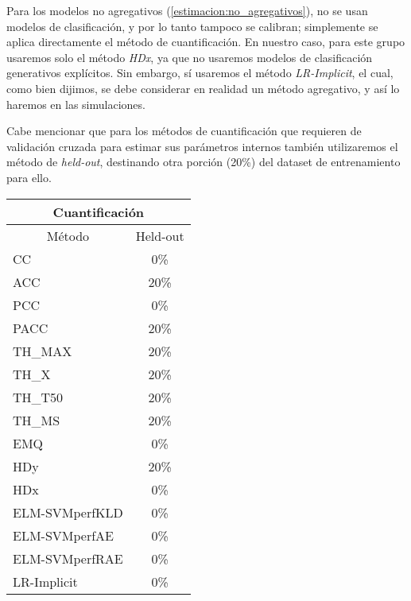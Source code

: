 Para los modelos no agregativos (\ref{estimacion:no_agregativos}), no se usan
modelos de clasificación, y por lo tanto tampoco se calibran; simplemente se
aplica directamente el método de cuantificación. En nuestro caso, para este
grupo usaremos solo el método {\it HDx}, ya que no usaremos modelos de
clasificación generativos explícitos. Sin embargo, sí usaremos el método {\it
LR-Implicit}, el cual, como bien dijimos, se debe considerar en realidad un
método agregativo, y así lo haremos en las simulaciones.

Cabe mencionar que para los métodos de cuantificación que requieren de
validación cruzada para estimar sus parámetros internos también utilizaremos el
método de {\it held-out}, destinando otra porción (20\%) del dataset de
entrenamiento para ello.
\begin{center}
    \begin{tabular}{|lc|}
        \hline
        \multicolumn{2}{|c|}{Cuantificación}                              \\
        \hline
        \multicolumn{1}{|c|}{Método}      & \multicolumn{1}{c|}{Held-out} \\
        \hline
        \multicolumn{1}{|l|}{CC}          & \multicolumn{1}{c|}{0\%}      \\
        \multicolumn{1}{|l|}{ACC}         & \multicolumn{1}{c|}{20\%}     \\
        \multicolumn{1}{|l|}{PCC}         & \multicolumn{1}{c|}{0\%}      \\
        \multicolumn{1}{|l|}{PACC}        & \multicolumn{1}{c|}{20\%}     \\
        \multicolumn{1}{|l|}{TH\_MAX}     & \multicolumn{1}{c|}{20\%}     \\
        \multicolumn{1}{|l|}{TH\_X}       & \multicolumn{1}{c|}{20\%}     \\
        \multicolumn{1}{|l|}{TH\_T50}     & \multicolumn{1}{c|}{20\%}     \\
        \multicolumn{1}{|l|}{TH\_MS}      & \multicolumn{1}{c|}{20\%}     \\
        \multicolumn{1}{|l|}{EMQ}         & \multicolumn{1}{c|}{0\%}      \\
        \multicolumn{1}{|l|}{HDy}         & \multicolumn{1}{c|}{20\%}     \\
        \multicolumn{1}{|l|}{HDx}         & \multicolumn{1}{c|}{0\%}      \\
        \multicolumn{1}{|l|}{ELM-SVMperfKLD}  & \multicolumn{1}{c|}{0\%} \\
        \multicolumn{1}{|l|}{ELM-SVMperfAE}   & \multicolumn{1}{c|}{0\%} \\
        \multicolumn{1}{|l|}{ELM-SVMperfRAE}  & \multicolumn{1}{c|}{0\%} \\
        \multicolumn{1}{|l|}{LR-Implicit} & \multicolumn{1}{c|}{0\%}      \\
        \hline
    \end{tabular}
    \label{experimentos:tabla_cuantificacion}
\end{center}

